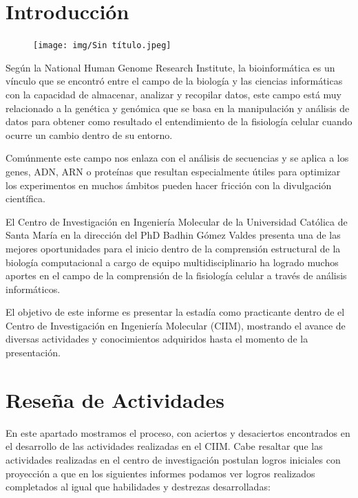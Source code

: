 \documentclass[a4paper,12pt]{article}
\begin{document}

\section{Introducción}

\begin{figure}
     \vspace{-20pt}
        \begin{center}
            \texttt{[image: img/Sin título.jpeg]}
        \end{center}
    \vspace{-20pt}
\end{figure}

Según la National Human Genome Research Institute, la bioinformática es  un vínculo que se encontró entre el campo de la biología y las ciencias informáticas con la capacidad de almacenar, analizar y recopilar datos, este campo está muy relacionado a la genética y genómica que se basa en la manipulación y análisis de datos para obtener como resultado el entendimiento de la fisiología celular cuando ocurre un cambio dentro de su entorno.


Comúnmente este campo nos enlaza con el análisis de secuencias y se aplica a los genes, ADN,  ARN o proteínas que resultan especialmente útiles para optimizar los experimentos en muchos ámbitos pueden hacer fricción con la divulgación científica. 

El Centro de Investigación en Ingeniería Molecular de la Universidad Católica de Santa María en la dirección del PhD Badhin Gómez Valdes presenta una de las mejores oportunidades para el inicio dentro de la comprensión estructural de la biología computacional a cargo de equipo multidisciplinario ha logrado muchos aportes en el campo de la comprensión de la fisiología celular a través de análisis informáticos.

El objetivo de este informe es presentar la estadía como practicante dentro de el Centro de Investigación en Ingeniería Molecular (CIIM), mostrando el avance de diversas actividades y conocimientos adquiridos hasta el momento de la presentación.


\section{Reseña de Actividades}
En este apartado mostramos el proceso, con aciertos y desaciertos encontrados en el desarrollo de las actividades realizadas en el CIIM. Cabe resaltar que las actividades realizadas en el centro de investigación postulan logros iniciales con proyección a que en los siguientes informes podamos ver logros realizados completados al igual que habilidades y destrezas desarrolladas:
\end{document}
